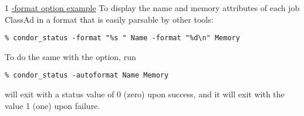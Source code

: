 \begin{ManPage}{\label{man-condor-status}}{1}
\underline{-format option example}
To display the name and memory attributes of each job ClassAd in a format
that is easily parsable by other tools:
\begin{verbatim}
% condor_status -format "%s " Name -format "%d\n" Memory
\end{verbatim}
To do the same with the  option, run
\begin{verbatim}
% condor_status -autoformat Name Memory
\end{verbatim}


\ExitStatus

 will exit with a status value of 0 (zero) upon success,
and it will exit with the value 1 (one) upon failure.

\end{ManPage}

